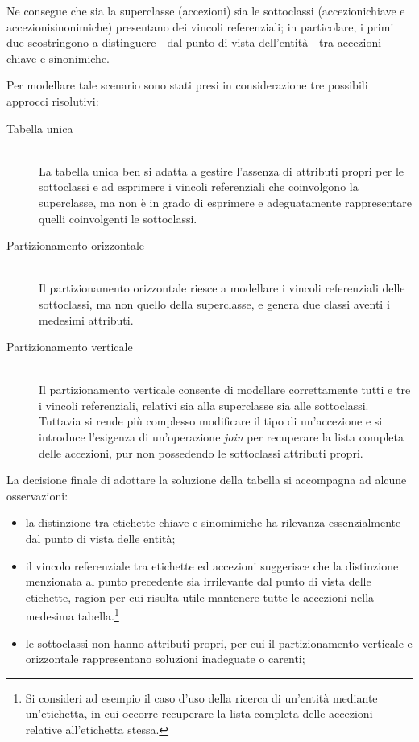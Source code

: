Ne consegue che sia la superclasse (\textsf{accezioni}) sia le sottoclassi (\textsf{accezioni\textunderscore chiave} e \textsf{accezioni\textunderscore sinonimiche}) presentano dei vincoli referenziali; in particolare, i primi due scostringono a distinguere - dal punto di vista dell'entità - tra accezioni chiave e sinonimiche.

Per modellare tale scenario sono stati presi in considerazione tre possibili approcci risolutivi:
\begin{description}
\item[Tabella unica] \hfill \\
La tabella unica ben si adatta a gestire l'assenza di attributi propri per le sottoclassi e ad esprimere i vincoli referenziali che coinvolgono la superclasse, ma non è in grado di esprimere e adeguatamente rappresentare quelli coinvolgenti le sottoclassi.
\item[Partizionamento orizzontale] \hfill \\
Il partizionamento orizzontale riesce a modellare i vincoli referenziali delle sottoclassi, ma non quello della superclasse, e genera due classi aventi i medesimi attributi.
\item[Partizionamento verticale] \hfill \\
Il partizionamento verticale consente di modellare correttamente tutti e tre i vincoli referenziali, relativi sia alla superclasse sia alle sottoclassi. Tuttavia si rende più complesso modificare il tipo di un'accezione e si introduce l'esigenza di un'operazione \textit{join} per recuperare la lista completa delle accezioni, pur non possedendo le sottoclassi attributi propri.
\end{description}

La decisione finale di adottare la soluzione della tabella si accompagna ad alcune osservazioni:
\begin{itemize}
\item la distinzione tra etichette chiave e sinomimiche ha rilevanza essenzialmente dal punto di vista delle entità;
\item il vincolo referenziale tra \textsf{etichette} ed \textsf{accezioni} suggerisce che la distinzione menzionata al punto precedente sia irrilevante dal punto di vista delle etichette, ragion per cui risulta utile mantenere tutte le accezioni nella medesima tabella.\footnote{Si consideri ad esempio il caso d'uso della ricerca di un'entità mediante un'etichetta, in cui occorre recuperare la lista completa delle accezioni relative all'etichetta stessa.}
\item le sottoclassi non hanno attributi propri, per cui il partizionamento verticale e orizzontale rappresentano soluzioni inadeguate o carenti;
\end{itemize}

